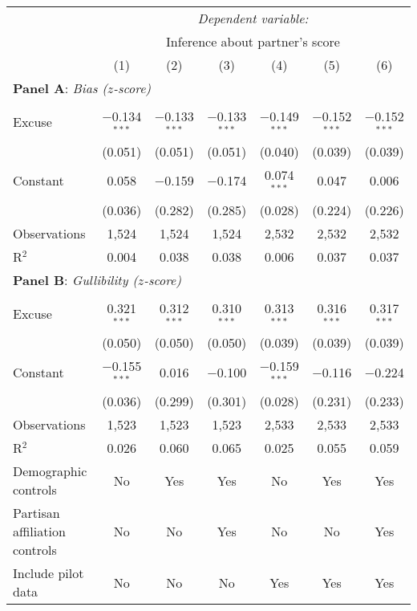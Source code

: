 \begin{table}[!htbp] \centering 
  \label{t:1-score}
\begin{threeparttable}
\begin{tabular}{@{\hspace{5pt}}l@{\hspace{5pt}}cccccc} 
\toprule 
 & \multicolumn{6}{c}{\textit{Dependent variable:}} \\ 
\cmidrule(rr){2-7} 
 & \multicolumn{6}{c}{Inference about partner's score} \\ 
 & (1) & (2) & (3) & (4) & (5) & (6)\\ 
\midrule  
\midrule
\multicolumn{7}{l}{\textbf{Panel A}: \textit{Bias ($z$-score)}} \\
\midrule
\\[-2.1ex] Excuse & $-$0.134$^{***}$ & $-$0.133$^{***}$ & $-$0.133$^{***}$ & $-$0.149$^{***}$ & $-$0.152$^{***}$ & $-$0.152$^{***}$ \\ 
  & (0.051) & (0.051) & (0.051) & (0.040) & (0.039) & (0.039) \\ 
 \addlinespace 
 Constant & 0.058 & $-$0.159 & $-$0.174 & 0.074$^{***}$ & 0.047 & 0.006 \\ 
  & (0.036) & (0.282) & (0.285) & (0.028) & (0.224) & (0.226) \\ 
 \addlinespace 
\midrule  
Observations & 1,524 & 1,524 & 1,524 & 2,532 & 2,532 & 2,532 \\ 
R$^{2}$ & 0.004 & 0.038 & 0.038 & 0.006 & 0.037 & 0.037 \\ 
\midrule
\midrule
\multicolumn{7}{l}{\textbf{Panel B}: \textit{Gullibility ($z$-score)}} \\
\midrule
\\[-2.1ex] Excuse & 0.321$^{***}$ & 0.312$^{***}$ & 0.310$^{***}$ & 0.313$^{***}$ & 0.316$^{***}$ & 0.317$^{***}$ \\ 
  & (0.050) & (0.050) & (0.050) & (0.039) & (0.039) & (0.039) \\ 
 \addlinespace 
 Constant & $-$0.155$^{***}$ & 0.016 & $-$0.100 & $-$0.159$^{***}$ & $-$0.116 & $-$0.224 \\ 
  & (0.036) & (0.299) & (0.301) & (0.028) & (0.231) & (0.233) \\ 
 \addlinespace 
\midrule  
Observations & 1,523 & 1,523 & 1,523 & 2,533 & 2,533 & 2,533 \\ 
R$^{2}$ & 0.026 & 0.060 & 0.065 & 0.025 & 0.055 & 0.059 \\ 
\midrule
\midrule
Demographic controls & No & Yes & Yes & No & Yes & Yes \\ 
Partisan affiliation controls & No & No & Yes & No & No & Yes \\ 
Include pilot data & No & No & No & Yes & Yes & Yes \\
\bottomrule 
\end{tabular} 
\end{threeparttable}
\end{table} 
